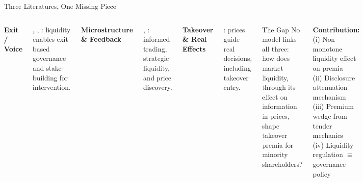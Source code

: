 \documentclass[aspectratio=169,10pt]{beamer}
\newcommand{\1}{\mathbf{1}}
\begin{document}
\begin{frame}{Three Literatures, One Missing Piece}
\hypertarget{main:literature}{}
\small
\begin{columns}[T,onlytextwidth]

{\textbf{Exit / Voice}\par}
\vspace{0.3em}
\citealp{Edmans2009}, \citealp{Maug1998}, \citealp{AdmatiPfleiderer2009}: liquidity enables exit-based governance and stake-building for intervention.

\vspace{0.25em}

{\textbf{Microstructure \& Feedback}\par}
\vspace{0.3em}
\citealp{Kyle1985}, \citealp{BackEtAl2018}: informed trading, strategic liquidity, and price discovery.

\vspace{0.25em}

{\textbf{Takeover \& Real Effects}\par}
\vspace{0.3em}
\citealp{EdmansGoldsteinJiang2012}: prices guide real decisions, including takeover entry.

\begin{block}{The Gap}
No model links all three: how does market liquidity, through its effect on information in prices, shape takeover premia for minority shareholders?
\end{block}

\vspace{0.2em}

{\small\textbf{Contribution:}\\[0.2em]
(i) Non-monotone liquidity effect on premia\\
(ii) Disclosure attenuation mechanism\\
(iii) Premium wedge from tender mechanics\\
(iv) Liquidity regulation $\equiv$ governance policy}
\end{columns}
\end{frame}
\end{document}
